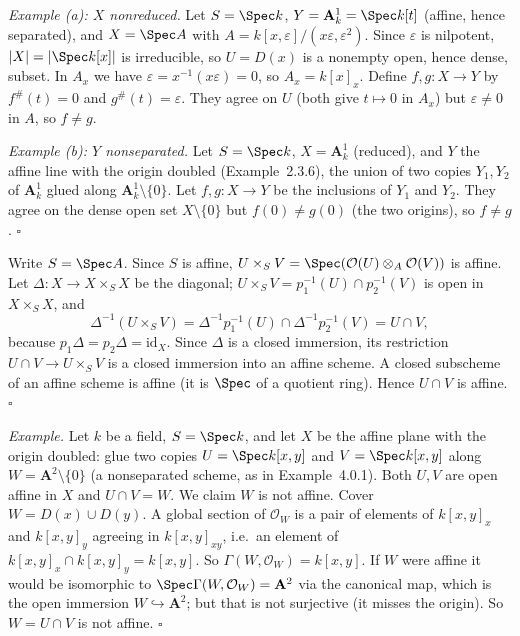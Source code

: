 \documentclass[11pt]{article}
\begin{document}
\emph{Example (a): $X$ nonreduced.} Let $S=\Spec k$, $Y=\mathbf A^1_k=\Spec k[t]$ (affine, hence separated), and $X=\Spec A$ with $A=k[x,\varepsilon]/(x\varepsilon,\varepsilon^2)$. Since $\varepsilon$ is nilpotent, $|X|=|\Spec k[x]|$ is irreducible, so $U=D(x)$ is a nonempty open, hence dense, subset. In $A_x$ we have $\varepsilon=x^{-1}(x\varepsilon)=0$, so $A_x=k[x]_x$. Define $f,g:X\to Y$ by $f^\#(t)=0$ and $g^\#(t)=\varepsilon$. They agree on $U$ (both give $t\mapsto 0$ in $A_x$) but $\varepsilon\neq0$ in $A$, so $f\neq g$.

\emph{Example (b): $Y$ nonseparated.} Let $S=\Spec k$, $X=\mathbf A^1_k$ (reduced), and $Y$ the affine line with the origin doubled (Example~2.3.6), the union of two copies $Y_1,Y_2$ of $\mathbf A^1_k$ glued along $\mathbf A^1_k\setminus\{0\}$. Let $f,g:X\to Y$ be the inclusions of $Y_1$ and $Y_2$. They agree on the dense open set $X\setminus\{0\}$ but $f(0)\neq g(0)$ (the two origins), so $f\ne g$. \hfill$\square$

\pf
Write $S=\Spec A$. Since $S$ is affine, $U\times_SV=\Spec(\mathcal O(U)\otimes_A\mathcal O(V))$ is affine. Let $\Delta:X\to X\times_SX$ be the diagonal; $U\times_SV=p_1^{-1}(U)\cap p_2^{-1}(V)$ is open in $X\times_SX$, and
\[
\Delta^{-1}(U\times_SV)=\Delta^{-1}p_1^{-1}(U)\cap\Delta^{-1}p_2^{-1}(V)=U\cap V,
\]
because $p_1\Delta=p_2\Delta=\mathrm{id}_X$. Since $\Delta$ is a closed immersion, its restriction $U\cap V\to U\times_SV$ is a closed immersion into an affine scheme. A closed subscheme of an affine scheme is affine (it is $\Spec$ of a quotient ring). Hence $U\cap V$ is affine. \hfill$\square$

\emph{Example.} Let $k$ be a field, $S=\Spec k$, and let $X$ be the affine plane with the origin doubled: glue two copies $U=\Spec k[x,y]$ and $V=\Spec k[x,y]$ along $W=\mathbf A^2\setminus\{0\}$ (a nonseparated scheme, as in Example~4.0.1). Both $U,V$ are open affine in $X$ and $U\cap V=W$. We claim $W$ is not affine. Cover $W=D(x)\cup D(y)$. A global section of $\mathcal O_W$ is a pair of elements of $k[x,y]_x$ and $k[x,y]_y$ agreeing in $k[x,y]_{xy}$, i.e.\ an element of $k[x,y]_x\cap k[x,y]_y=k[x,y]$. So $\Gamma(W,\mathcal O_W)=k[x,y]$. If $W$ were affine it would be isomorphic to $\Spec\Gamma(W,\mathcal O_W)=\mathbf A^2$ via the canonical map, which is the open immersion $W\hookrightarrow\mathbf A^2$; but that is not surjective (it misses the origin). So $W=U\cap V$ is not affine. \hfill$\square$
\end{document}

